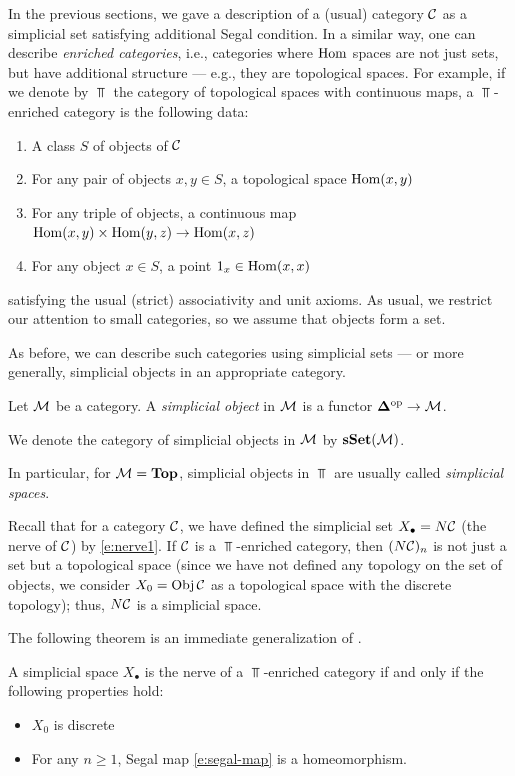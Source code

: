 In the previous sections, we gave a description of a (usual) category $\mathcal{C}$ as
a simplicial set satisfying additional Segal condition. In a similar way, one
can describe \emph{enriched categories}, i.e., categories where $\operatorname{Hom}$ spaces
are not just sets, but have additional structure --- e.g., they are topological
spaces. For example, if we denote by $\Top$ the category of topological spaces
with continuous maps, a $\Top$-enriched category is the following data:
\begin{enumerate}
\item A class $S$ of objects of $\mathcal{C}$
\item For any pair of objects $x,y\in S$, a topological space
  $\operatorname{Hom}(x,y)$
\item For any triple of objects, a continuous map
      $\operatorname{Hom}(x,y)\times \operatorname{Hom}(y,z)\to \operatorname{Hom}(x,z)$
\item For any object $x\in S$, a point $1_x\in \operatorname{Hom}(x,x)$
\end{enumerate}
satisfying the usual (strict) associativity and unit axioms. As usual, we
restrict our attention to small categories, so we assume that objects form a
set.

As before, we can describe such categories using simplicial sets --- or more
generally, simplicial objects in an appropriate category.


\begin{definition}\label{d:simplicial-object}
  Let $\mathcal{M}$ be a category. A \emph{simplicial object} in $\mathcal{M}$
  is a functor $\mathbf{\Delta}^{\mathrm{op}}\to \mathcal{M}$.

  We denote the category of simplicial objects in $\mathcal{M}$ by $\mathbf{sSet}(\mathcal{M})$.
\end{definition}
In particular, for $\mathcal{M}=\mathbf{Top}$, simplicial objects in $\Top$
are usually called \emph{simplicial spaces}.

Recall that for a category $\mathcal{C}$, we have defined the simplicial set
$X_\bullet = N\mathcal{C}$ (the nerve of $\mathcal{C}$) by \eqref{e:nerve1}. If $\mathcal{C}$ is a
$\Top$-enriched category, then $(N\mathcal{C})_n$ is not just a set but a topological
space (since we have not defined any topology on the set of objects, we consider
$X_0=\operatorname{Obj} \mathcal{C}$ as a topological space with the discrete topology); thus,
$N\mathcal{C}$ is a simplicial space.


The following theorem is an immediate generalization of .
\begin{theorem}\label{t:nerve-characterization}
  A simplicial space $X_\bullet$ is the nerve of a $\Top$-enriched
  category if and only if the following properties hold:
  \begin{itemize}
    \item $X_0$ is discrete
    \item For any $n\ge 1$, Segal map \eqref{e:segal-map} is a homeomorphism.
  \end{itemize}
\end{theorem}





